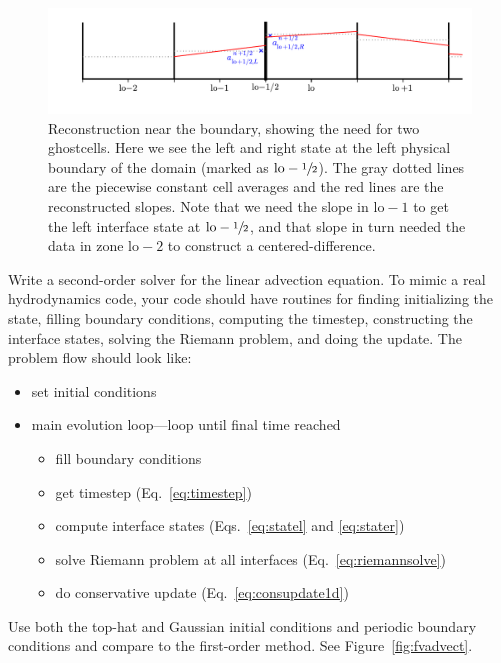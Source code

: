 \begin{figure}[t]
\centering
\includegraphics[width=\linewidth]{riemann-bc}
\caption[Reconstruction at the domain boundary]
        {\label{fig:advect_ghost} Reconstruction near the boundary,
          showing the need for two ghostcells.  Here we see the left
          and right state at the left physical boundary of the domain
          (marked as $\mathrm{lo}-\sfrac{1}{2}$).  The gray dotted lines
          are the piecewise constant cell averages and the red lines
          are the reconstructed slopes.  Note that we need the slope
          in $\mathrm{lo}-1$ to get the left interface state at
          $\mathrm{lo}-\sfrac{1}{2}$, and that slope in turn needed the
          data in zone $\mathrm{lo}-2$ to construct a
          centered-difference.}
\end{figure}


\begin{exercise}
{\label{adv:ex:fv} Write a second-order solver for the linear advection
  equation.  To mimic a real hydrodynamics code, your code should have
  routines for finding initializing the state, filling boundary conditions,
  computing the timestep,
  constructing the interface states, solving the Riemann problem, and
  doing the update.  The problem flow should look like:
  \begin{itemize}
    \item set initial conditions
    \item main evolution loop---loop until final time reached
    \begin{itemize}
      \item fill boundary conditions
      \item get timestep (Eq.~\ref{eq:timestep})
      \item compute interface states (Eqs.~\ref{eq:statel} and \ref{eq:stater})
      \item solve Riemann problem at all interfaces (Eq.~\ref{eq:riemannsolve})
      \item do conservative update (Eq.~\ref{eq:consupdate1d})
    \end{itemize}
  \end{itemize}
Use both the top-hat and Gaussian initial conditions and periodic boundary
conditions and compare to the first-order method.  See Figure~\ref{fig:fvadvect}.
}
\end{exercise}

